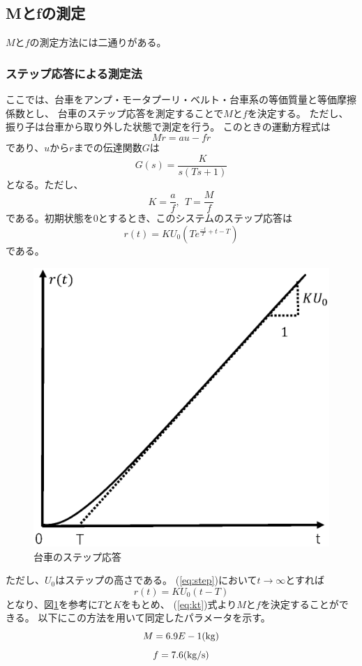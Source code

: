 \subsection{Mとfの測定}
	
	$M$と$f$の測定方法には二通りがある。
	\subsubsection{ステップ応答による測定法}
		ここでは、台車をアンプ・モータプーリ・ベルト・台車系の等価質量と等価摩擦係数とし、
		台車のステップ応答を測定することで$M$と$f$を決定する。
		ただし、振り子は台車から取り外した状態で測定を行う。
		このときの運動方程式は
		\[
			M\ddot{r} = au - f\dot{r}
		\]
		であり、$u$から$r$までの伝達関数$G$は
		\[
			G(s) = \frac{K}{s(Ts+1)}
		\]
		となる。ただし、
		\begin{equation}
			K = \frac{a}{f},\ \ T=\frac{M}{f}
			\label{eq:kt}
		\end{equation}
		である。初期状態を0とするとき、このシステムのステップ応答は
		\begin{equation}
			r(t) = KU_{0}\left(Te^{\frac{-t}{T}+t-T}\right)
			\label{eq:step}
		\end{equation}
		である。
		\begin{figure}[H]
			\centering
			\includegraphics[width=0.6\linewidth]{gazo/step.eps}
			\caption{台車のステップ応答}
			\label{image:parameterMF}
		\end{figure}
		ただし、$U_{0}$はステップの高さである。
		(\ref{eq:step})において$t→\infty$とすれば
		\[
			r(t) = KU_{0}(t-T)
		\]
		となり、図\ref{image:parameterMF}を参考に$T$と$K$をもとめ、
		(\ref{eq:kt})式より$M$と$f$を決定することができる。
		以下にこの方法を用いて同定したパラメータを示す。
		\[
			M=6.9E-1(\rm{kg})
		\]
		\[
			f=7.6(\rm{kg/s})
		\]
		
